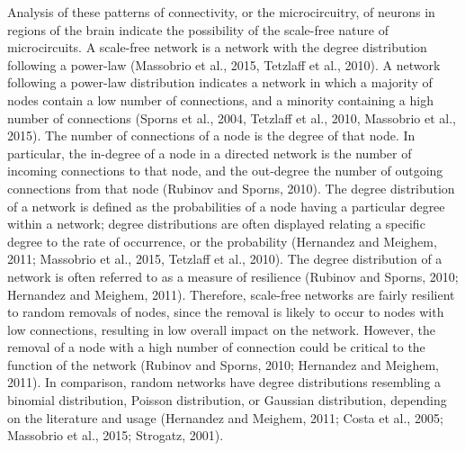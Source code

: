\documentclass[11pt,titlepage]{article}
\begin{document}
Analysis of these patterns of connectivity, or the microcircuitry, of neurons in regions of the brain indicate the possibility of the scale-free nature of microcircuits. A scale-free network is a network with the degree distribution following a power-law (Massobrio et al., 2015, Tetzlaff et al., 2010). A network following a power-law distribution indicates a network in which a majority of nodes contain a low number of connections, and a minority containing a high number of connections (Sporns et al., 2004, Tetzlaff et al., 2010, Massobrio et al., 2015). The number of connections of a node is the degree of that node. In particular, the in-degree of a node in a directed network is the number of incoming connections to that node, and the out-degree the number of outgoing connections from that node (Rubinov and Sporns, 2010). The degree distribution of a network is defined as the probabilities of a node having a particular degree within a network; degree distributions are often displayed relating a specific degree to the rate of occurrence, or the probability (Hernandez and Meighem, 2011; Massobrio et al., 2015, Tetzlaff et al., 2010). The degree distribution of a network is often referred to as a measure of resilience (Rubinov and Sporns, 2010; Hernandez and Meighem, 2011). Therefore, scale-free networks are fairly resilient to random removals of nodes, since the removal is likely to occur to nodes with low connections, resulting in low overall impact on the network. However, the removal of a node with a high number of connection could be critical to the function of the network (Rubinov and Sporns, 2010; Hernandez and Meighem, 2011). In comparison, random networks have degree distributions resembling a binomial distribution, Poisson distribution, or Gaussian distribution, depending on the literature and usage (Hernandez and Meighem, 2011; Costa et al., 2005; Massobrio et al., 2015; Strogatz, 2001).


\end{document}
